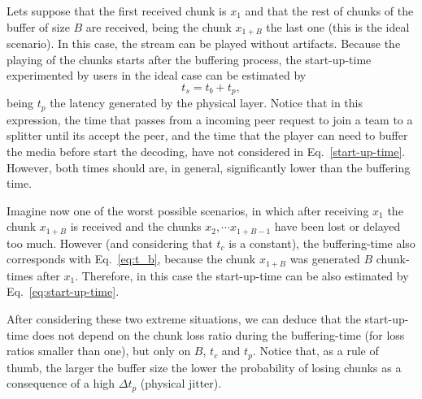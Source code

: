 Lets suppose that the first received chunk is $x_1$ and that the rest
of chunks of the buffer of size $B$ are received, being the chunk
$x_{1+B}$ the last one (this is the ideal scenario). In this case, the
stream can be played without artifacts. Because the playing of the
chunks starts after the buffering process, the \gls{start-up-time}
experimented by users in the ideal case can be estimated by
\begin{equation}
  t_s = t_b + t_p,
  \label{eq:start-up-time}
\end{equation}
being $t_p$ the latency generated by the physical layer. Notice that
in this expression, the time that passes from a incoming peer request
to join a team to a splitter until its accept the peer, and the time
that the player can need to buffer the media before start the
decoding, have not considered in Eq.~\ref{start-up-time}. However,
both times should are, in general, significantly lower than the
buffering time.

Imagine now one of the worst possible scenarios, in which after
receiving $x_1$ the chunk $x_{1+B}$ is received and the
chunks $x_2, \cdots x_{1+B-1}$ have been lost or delayed too much.
However (and considering that $t_c$ is a constant), the buffering-time
also corresponds with Eq.~\ref{eq:t_b}, because the chunk $x_{1+B}$
was generated $B$ chunk-times after $x_1$. Therefore, in this case the
start-up-time can be also estimated by Eq.~\ref{eq:start-up-time}.

After considering these two extreme situations, we can deduce that the
start-up-time does not depend on the chunk loss ratio during the
buffering-time (for loss ratios smaller than one), but only
on $B$, $t_c$ and $t_p$. Notice that, as a rule of thumb,  
the larger the buffer size the lower the probability of losing
chunks as a consequence of a high $\Delta t_p$ (physical jitter).
